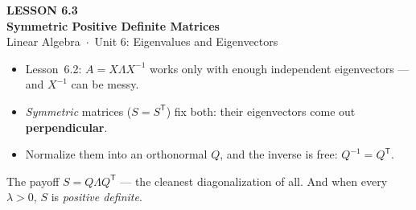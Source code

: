 \documentclass[aspectratio=169, 11pt]{beamer}
\newcommand{\T}{\mathsf{T}}
\begin{document}
{
\begin{frame}[plain]
  \vspace{2.8cm}\hspace{0.55cm}%
  \begin{minipage}{0.9\textwidth}
    {\color{goldacc}\bfseries\small LESSON 6.3}\\[0.5cm]
    {\color{white}\bfseries\LARGE Symmetric Positive Definite Matrices}\\[1.0cm]
    {\color{blushmid}\small Linear Algebra~$\cdot$~Unit 6: Eigenvalues and Eigenvectors}
  \end{minipage}
\end{frame}
}

\begin{frame}[t, plain]
  \begin{itemize}
    \setlength{\itemsep}{7pt}
    \item Lesson~6.2: $A=X\Lambda X^{-1}$ works only with enough independent eigenvectors --- and $X^{-1}$ can be messy.
    \item \emph{Symmetric} matrices ($S=S^{\T}$) fix both: their eigenvectors come out \textbf{perpendicular}.
    \item Normalize them into an orthonormal $Q$, and the inverse is free: $Q^{-1}=Q^{\T}$.
  \end{itemize}
  \begin{block}{The payoff}
    $S=Q\Lambda Q^{\T}$ --- the cleanest diagonalization of all. And when every $\lambda>0$, $S$ is
    \emph{positive definite}.
  \end{block}
\end{frame}
\end{document}
